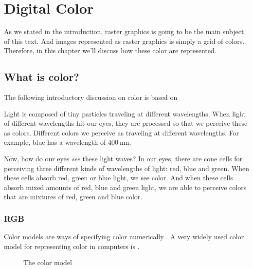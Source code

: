 \begin{comment}
  
\end{comment}

\chapter{Digital Color}
\label{cha:color}

As we stated in the introduction, raster graphics is going to be the
main subject of this text. And images represented as raster graphics
is simply a grid of colors. Therefore, in this chapter we'll discuss
how these color are represented.

\section{What is color?}

The following introductory discussion on color is based on
\cite{neider93:_openg_progr_guide,ohlsson99:_digit_bild_kreat,schanda97:_colorimetry,Cotton95colour,Pascale2003_ReviewRGBColourSpaces}

\newcommand{\bluewave}{\ensuremath{\SI{400}{\nano\meter}}}

Light is composed of tiny particles traveling at different
wavelengths. When light of different wavelengths hit
our eyes, they are processed so that we perceive these as
colors. Different colors we perceive as traveling at different
wavelengths. For example, blue has a wavelength of \bluewave.

Now, how do our eyes \textit{see} these light waves? In our eyes,
there are cone cells for perceiving three different kinds of
wavelengths of light: red, blue and green. When these cells absorb
red, green or blue light, we see color. And when these cells absorb
mixed amounts of red, blue and green light, we are able to perceive
colors that are mixtures of red, green and blue color.

\subsection{RGB}
\label{sec:rgb}

Color models are ways of specifying color numerically
\cite{hearn1997computer_graphics,Pascale2003_ReviewRGBColourSpaces}. A
very widely used color model for representing color in computers is
\rgb.

\begin{figure}
  \centering
  \caption{The \rgb color model}
  \label{fig:rgb}
\end{figure}

